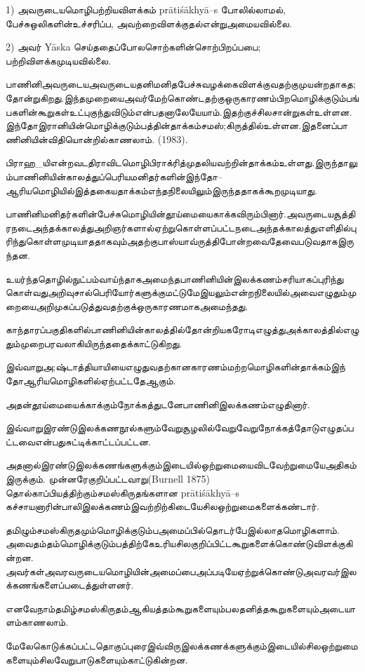 1) அவருடையமொழிபற்றியவிளக்கம் prātiśākhyā–s போலில்லாமல், பேச்சுஒலிகளின்உச்சரிப்ப, அவற்றைவிளக்குதல்என்றுஅமையவில்லை. 

2) அவர் Yāska செய்ததைப்போலசொற்களின்சொற்பிறப்பபை; பற்றிவிளக்கமுடியவில்லை.

பாணினிஅவருடையஅவருடையதனிமனிதபேச்சுவழக்கைவிளக்குவதற்குமுயன்றதாகத;தோன்றுகிறது.இந்தமுறையைஅவர்மேற்கொண்டதற்குஒருகாரணம்பிறமொழிக்குடும்பங்பகளின்கூறுகள்உட்புகுந்துவிடும்என்பதனாலேயேயாம்.இதற்குச்சிலசான்றுகள்உள்ளன.இந்தோஇரானியின்மொழிக்குடும்பத்தின்தாக்கம்சமஸ்;கிருத்தில்உள்ளன.இதனைப்பாணினியின்விதியொன்றில்காணலாம். (1983).

 பிராஹ\_யிஎன்றவடதிராவிடமொழிபிராக்ரித்முதலியவற்றின்தாக்கம்உள்ளது.இருந்தாலும்பாணினியின்காலத்துப்பெரியமனிதர்களின்இந்தோ–ஆரியமொழியில்இத்தகையதாக்கம்எந்தநிலையிலும்இருந்ததாகக்கூறமுடியாது. 

பாணினிமனிதர்களின்பேச்சுமொழியின்தூய்மையைகாக்கவிரும்பினார்.அவருடையசூத்திரநடைஅந்தக்காலத்துஅறிஞர்களால்ஏற்றுகொள்ளப்பட்டநடைஅந்தக்காலத்துஎளிதில்புரிந்துகொள்ளமுடியாததாகவும்அதற்குபாஸ்யாவ்ருத்திபோன்றவைதேவைபடுவதாகஇருந்தன.

 உயர்ந்ததொழில்நுட்பம்வாய்ந்தாகஅமைந்தபாணினியின்இலக்கணம்சரியாகப்புரிந்துகொள்வதுஅறிவுசால்பெரியோர்களுக்குமட்டுமேஇயலும்என்றநிலையில்அவைஎழுதும்முறையைஅறிமுகப்படுத்துவதற்குக்ஒருகாரணமாகஅமைந்தது.

காந்தாரப்பகுதிகளில்பாணினியின்காலத்தில்தோன்றியகரோடிஎழுத்துஅக்காலத்தில்எழுதும்முறைபரவலாகியிருந்ததைக்காட்டுகிறது. 

இவ்வாறுஅ;ஷ்டாத்தியாயியைஎழுதுவதற்கானகாரணம்மற்றமொழிகளின்தாக்கம்இந்தோஆரியமொழிகளில்ஏற்பட்டதேஆகும்.

அதன்தூய்மையைக்காக்கும்நோக்கத்துடனேபாணினிஇலக்கணம்எழுதினார்.

இவ்வாறுஇரண்டுஇலக்கணநூல்களும்வேறுசூழலில்வேறுவேறுநோக்கத்தோடுஎழுதப்பட்டவைஎன்பதுசுட்டிக்காட்டப்பட்டன.

அதனால்இரண்டுஇலக்கணங்களுக்கும்இடையில்ஒற்றுமையைவிடவேற்றுமையேஅதிகம்இருக்கும். முன்னரேகுறிப்பட்டவாறு(Burnell 1875) தொல்காப்பியத்திற்கும்சமஸ்கிருதங்களான prātiśākhyā–s கச்சாயனாரின்பாலிஇலக்கணம்இவற்றிற்கிடையேசிலஒற்றுமைகளைக்கண்டார்.

தமிழும்சமஸ்கிருதமும்மொழிக்குடும்பஅமைப்பில்தொடர்பேஇல்லாதமொழிகளாம். அவைதம்தம்மொழிக்குடும்பத்திற்கேஉரியசிலகுறிப்பிட்டகூறுகளைக்கொண்டுவிளக்குகின்றன. அவர்கள்அவரவருடையமொழியின்அமைப்பைஅப்படியேஏற்றுக்கொண்டுஅவரவர்இலக்கணங்களைப்படைத்துள்ளனர். 

எனவேநாம்தமிழ்சமஸ்கிருதம்ஆகியத்தம்கூறுகளையும்பலதனித்தகூறுகளையும்அடையாளம்காணலாம். 

மேலேகொடுக்கப்பட்டதொகுப்புரைஇவ்விருஇலக்கணக்களுக்கும்இடையில்சிலஒற்றுமைகளையும்சிலவேறுபாடுகளையும்காட்டுகின்றன.


